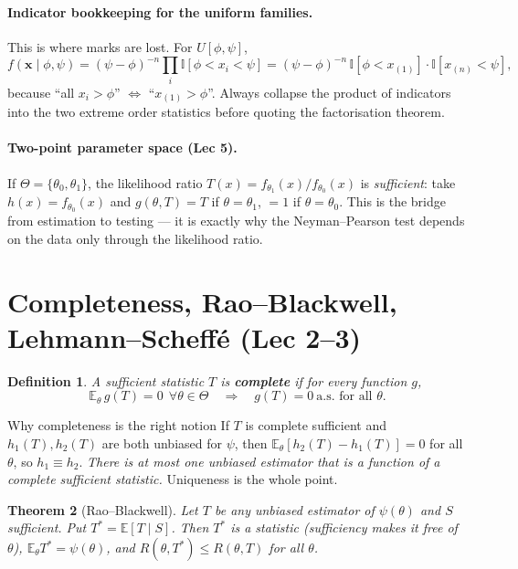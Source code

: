 \documentclass[11pt]{article}
\newtheorem{theorem}{Theorem}[section]
\newtheorem{definition}[theorem]{Definition}
\theoremstyle{remark}
\newcommand{\E}{\mathbb{E}}
\begin{document}
\paragraph{Indicator bookkeeping for the uniform families.} This is where marks are lost.
For $U[\phi,\psi]$,
\[
f(\mathbf{x}\mid\phi,\psi)=(\psi-\phi)^{-n}\prod_i \mathbb{I}[\phi<x_i<\psi]
=(\psi-\phi)^{-n}\,\mathbb{I}[\phi<x_{(1)}]\cdot\mathbb{I}[x_{(n)}<\psi],
\]
because ``all $x_i>\phi$'' $\iff$ ``$x_{(1)}>\phi$''. Always collapse the product of
indicators into the two extreme order statistics before quoting the factorisation theorem.

\paragraph{Two-point parameter space (Lec 5).} If $\Theta=\{\theta_0,\theta_1\}$, the
likelihood ratio $T(x)=f_{\theta_1}(x)/f_{\theta_0}(x)$ is \emph{sufficient}: take
$h(x)=f_{\theta_0}(x)$ and $g(\theta,T)=T$ if $\theta=\theta_1$, $=1$ if $\theta=\theta_0$.
This is the bridge from estimation to testing --- it is exactly why the Neyman--Pearson test
depends on the data only through the likelihood ratio.

\section{Completeness, Rao--Blackwell, Lehmann--Scheff\'e (Lec 2--3)}

\begin{definition}
A sufficient statistic $T$ is \textbf{complete} if for every function $g$,
\[
\E_\theta\, g(T)=0\ \ \forall\theta\in\Theta \quad\Longrightarrow\quad g(T)=0\ \text{a.s.\ for all }\theta.
\]
\end{definition}

\begin{keybox}{Why completeness is the right notion}
If $T$ is complete sufficient and $h_1(T),h_2(T)$ are both unbiased for $\psi$, then
$\E_\theta[h_2(T)-h_1(T)]=0$ for all $\theta$, so $h_1\equiv h_2$. \emph{There is at most one
unbiased estimator that is a function of a complete sufficient statistic.} Uniqueness is the
whole point.
\end{keybox}

\begin{theorem}[Rao--Blackwell]
Let $T$ be any unbiased estimator of $\psi(\theta)$ and $S$ sufficient. Put
$T^*=\E[T\mid S]$. Then $T^*$ is a statistic (sufficiency makes it free of $\theta$),
$\E_\theta T^*=\psi(\theta)$, and $R(\theta,T^*)\le R(\theta,T)$ for all $\theta$.
\end{theorem}
\end{document}
